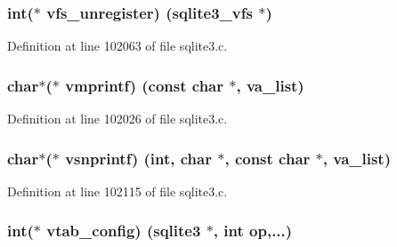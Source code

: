 \subsubsection[{vfs\+\_\+unregister}]{\setlength{\rightskip}{0pt plus 5cm}int($\ast$ vfs\+\_\+unregister) ({\bf sqlite3\+\_\+vfs} $\ast$)}\label{structsqlite3__api__routines_a09efe186d4fccb340af27ca4d005543e}


Definition at line 102063 of file sqlite3.\+c.

\hypertarget{structsqlite3__api__routines_a36b2c16f8536849536034592361cae1e}{}
\subsubsection[{vmprintf}]{\setlength{\rightskip}{0pt plus 5cm}char$\ast$($\ast$ vmprintf) (const char $\ast$, va\+\_\+list)}\label{structsqlite3__api__routines_a36b2c16f8536849536034592361cae1e}


Definition at line 102026 of file sqlite3.\+c.

\hypertarget{structsqlite3__api__routines_a10f112f1a39aea290157e4fb13b7aaf1}{}
\subsubsection[{vsnprintf}]{\setlength{\rightskip}{0pt plus 5cm}char$\ast$($\ast$ vsnprintf) (int, char $\ast$, const char $\ast$, va\+\_\+list)}\label{structsqlite3__api__routines_a10f112f1a39aea290157e4fb13b7aaf1}


Definition at line 102115 of file sqlite3.\+c.

\hypertarget{structsqlite3__api__routines_ac7793309e4ad5af153467746dee7606b}{}
\subsubsection[{vtab\+\_\+config}]{\setlength{\rightskip}{0pt plus 5cm}int($\ast$ vtab\+\_\+config) ({\bf sqlite3} $\ast$, int op,...)}\label{structsqlite3__api__routines_ac7793309e4ad5af153467746dee7606b}


